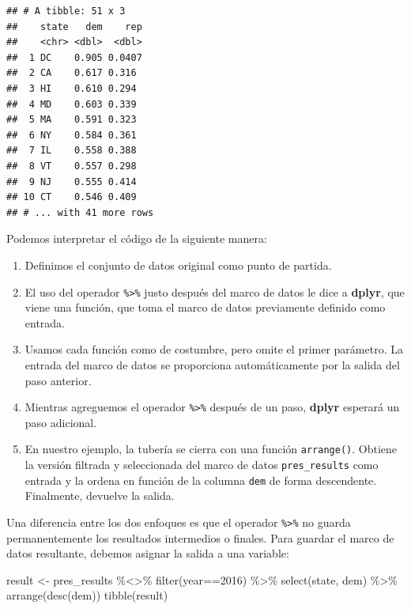 \documentclass[
]{book}
\newenvironment{Shaded}{\begin{snugshade}}{\end{snugshade}}
\newcommand{\DecValTok}[1]{\textcolor[rgb]{0.00,0.00,0.81}{#1}}
\newcommand{\FunctionTok}[1]{\textcolor[rgb]{0.00,0.00,0.00}{#1}}
\newcommand{\NormalTok}[1]{#1}
\newcommand{\OtherTok}[1]{\textcolor[rgb]{0.56,0.35,0.01}{#1}}
\newcommand{\SpecialCharTok}[1]{\textcolor[rgb]{0.00,0.00,0.00}{#1}}
\providecommand{\tightlist}{%
  \setlength{\itemsep}{0pt}\setlength{\parskip}{0pt}}
\begin{document}
\begin{verbatim}
## # A tibble: 51 x 3
##    state   dem    rep
##    <chr> <dbl>  <dbl>
##  1 DC    0.905 0.0407
##  2 CA    0.617 0.316 
##  3 HI    0.610 0.294 
##  4 MD    0.603 0.339 
##  5 MA    0.591 0.323 
##  6 NY    0.584 0.361 
##  7 IL    0.558 0.388 
##  8 VT    0.557 0.298 
##  9 NJ    0.555 0.414 
## 10 CT    0.546 0.409 
## # ... with 41 more rows
\end{verbatim}

Podemos interpretar el código de la siguiente manera:

\begin{enumerate}
\def\labelenumi{\arabic{enumi}.}
\tightlist
\item
  Definimos el conjunto de datos original como punto de partida.
\item
  El uso del operador \texttt{\%\textgreater{}\%} justo después del marco de datos le dice a \textbf{dplyr}, que viene una función, que toma el marco de datos previamente definido como entrada.
\item
  Usamos cada función como de costumbre, pero omite el primer parámetro. La entrada del marco de datos se proporciona automáticamente por la salida del paso anterior.
\item
  Mientras agreguemos el operador \texttt{\%\textgreater{}\%} después de un paso, \textbf{dplyr} esperará un paso adicional.
\item
  En nuestro ejemplo, la tubería se cierra con una función \texttt{arrange()}. Obtiene la versión filtrada y seleccionada del marco de datos \texttt{pres\_results} como entrada y la ordena en función de la columna \texttt{dem} de forma descendente. Finalmente, devuelve la salida.
\end{enumerate}

Una diferencia entre los dos enfoques es que el operador \texttt{\%\textgreater{}\%} no guarda permanentemente los resultados intermedios o finales. Para guardar el marco de datos resultante, debemos asignar la salida a una variable:

\begin{Shaded}
\begin{Highlighting}[]
\NormalTok{result }\OtherTok{\textless{}{-}}\NormalTok{ pres\_results }\SpecialCharTok{\%\textless{}\textgreater{}\%}
  \FunctionTok{filter}\NormalTok{(year}\SpecialCharTok{==}\DecValTok{2016}\NormalTok{) }\SpecialCharTok{\%\textgreater{}\%}
  \FunctionTok{select}\NormalTok{(state, dem) }\SpecialCharTok{\%\textgreater{}\%}
  \FunctionTok{arrange}\NormalTok{(}\FunctionTok{desc}\NormalTok{(dem))}
\FunctionTok{tibble}\NormalTok{(result)}
\end{Highlighting}
\end{Shaded}
\end{document}
